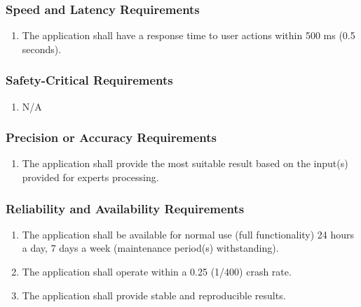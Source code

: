 \documentclass[]{article}
\begin{document}
\subsubsection{Speed and Latency Requirements}
\label{ssub:speed_and_latency_requirements}
\begin{enumerate}[{PR}1. ]
	\item The application shall have a response time to user actions within 500 ms (0.5 seconds).	
\end{enumerate}

\subsubsection{Safety-Critical Requirements}
\label{ssub:safety_critical_requirements}
\begin{enumerate}[{PR}1. ]
	\item N/A
\end{enumerate}

\subsubsection{Precision or Accuracy Requirements}
\label{ssub:precision_or_accuracy_requirements}
\begin{enumerate}[{PR}1. ]
	\item The application shall provide the most suitable result based on the input(s) provided for experts processing.
\end{enumerate}

\subsubsection{Reliability and Availability Requirements}
\label{ssub:reliability_and_availability_requirements}
\begin{enumerate}[{PR}1. ]
	\item The application shall be available for normal use (full functionality) 24 hours a day, 7 days a week (maintenance period(s) withstanding).
	\item The application shall operate within a 0.25 (1/400) crash rate.

	\item The application shall provide stable and reproducible results.
\end{enumerate}
\end{document}
